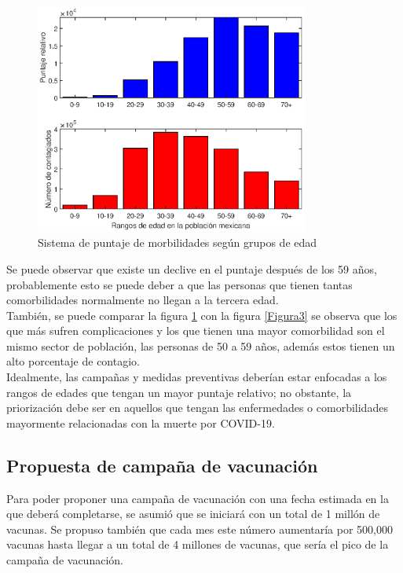 \documentclass[12pt,a4paper]{article}
\begin{document}
\begin{figure}
\centering
\includegraphics[width = 0.8\textwidth]{Figura4.eps}
\caption{Sistema de puntaje de morbilidades según grupos de edad}
\label{Figura4}
\end{figure}
Se puede observar que existe un declive en el puntaje después de los 59 años, probablemente esto se puede deber a que las personas que tienen tantas comorbilidades normalmente no llegan a la tercera edad.\\
También, se puede comparar la figura \ref{Figura4} con la figura \ref{Figura3} se observa que los que más sufren complicaciones y los que tienen una mayor comorbilidad son el mismo sector de población, las personas de 50 a 59 años, además estos tienen un alto porcentaje de contagio. \\


Idealmente, las campañas y medidas preventivas deberían estar enfocadas a los rangos de edades que tengan un mayor puntaje relativo; no obstante, la priorización debe ser en aquellos que tengan las enfermedades o comorbilidades mayormente relacionadas con la muerte por COVID-19.  
\setlength{\parindent}{1cm}
\subsection{Propuesta de campaña de vacunación}
\setlength{\parindent}{0cm}
Para poder proponer una campaña de vacunación con una fecha estimada en la que deberá completarse, se asumió que se iniciará con un total de 1 millón de vacunas. Se propuso también que cada mes este número aumentaría por 500,000 vacunas hasta llegar a un total de 4 millones de vacunas, que sería el pico de la campaña de vacunación.
\end{document}
